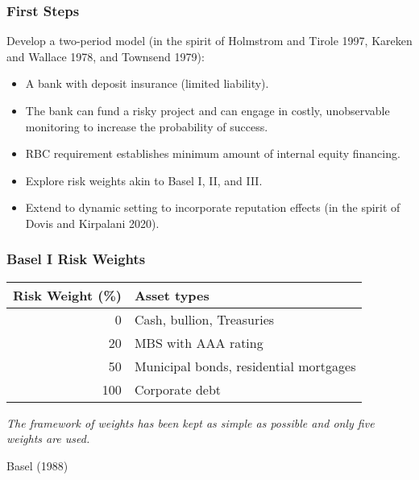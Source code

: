 \documentclass{beamer}
\begin{document}
\begin{frame}
\frametitle{First Steps}


Develop a two-period model (in the spirit of Holmstrom and Tirole 1997, Kareken and Wallace 1978, and Townsend 1979):

\bigskip

\begin{itemize}[<+->]

\item A bank with deposit insurance (limited liability).

\bigskip

\item The bank can fund a risky project and can engage in costly, unobservable monitoring to increase the probability of success.

\bigskip

\item RBC requirement establishes minimum amount of internal equity financing.

\bigskip

\item Explore risk weights akin to Basel I, II, and III.

\bigskip

\item Extend to dynamic setting to incorporate reputation effects (in the spirit of Dovis and Kirpalani 2020).

\end{itemize}
\end{frame}



\begin{frame}[label = basel_i]
\frametitle{Basel I Risk Weights}

\begin{center}
\begin{tabular}{ r | l}
Risk Weight (\%) & Asset types\\ 
\hline
  0 & Cash, bullion, Treasuries \\  
 20 & MBS with AAA rating \\
 50 & Municipal bonds, residential mortgages\\
100 & Corporate debt
\end{tabular}
\end{center}

\bigskip

\textit{The framework of weights has been kept as simple as possible and only five weights are used.} 

\begin{center}
 Basel (1988)
\end{center}

\hyperlink{risk_weights}{}


\end{frame}
\end{document}
